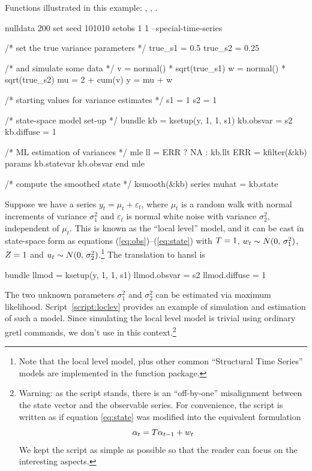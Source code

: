 Functions illustrated in this example: , ,
.

\begin{script}[htbp]
  \label{script:loclev}
\begin{scode}
nulldata 200
set seed 101010
setobs 1 1 --special-time-series

/* set the true variance parameters */
true_s1 = 0.5
true_s2 = 0.25

/* and simulate some data */
v = normal() * sqrt(true_s1)
w = normal() * sqrt(true_s2)
mu = 2 + cum(v)
y = mu + w

/* starting values for variance estimates */
s1 = 1
s2 = 1

/* state-space model set-up */
bundle kb = ksetup(y, 1, 1, s1)
kb.obsvar = s2
kb.diffuse = 1

/* ML estimation of variances */
mle ll = ERR ? NA : kb.llt
    ERR = kfilter(&kb)
    params kb.statevar kb.obsvar
end mle

/* compute the smoothed state */
ksmooth(&kb)
series muhat = kb.state
\end{scode}
\end{script}

Suppose we have a series $y_t = \mu_t + \varepsilon_t$, where $\mu_t$
is a random walk with normal increments of variance $\sigma^2_1$ and
$\varepsilon_t$ is normal white noise with variance $\sigma^2_2$,
independent of $\mu_t$. This is known as the ``local level'' model,
and it can be cast in state-space form as equations
(\ref{eq:obs})--(\ref{eq:state}) with $T = 1$, $w_t \sim
N(0,\, \sigma^2_1)$, $Z = 1$ and $u_t \sim N(0,\,
\sigma^2_2)$.\footnote{Note that the local level model, plus other
  common ``Structural Time Series'' models are implemented in the
   function package.} The translation to \textsf{hansl}
is
\begin{code}
bundle llmod = ksetup(y, 1, 1, s1)
llmod.obsvar = s2
llmod.diffuse = 1
\end{code}

The two unknown parameters $\sigma^2_1$ and $\sigma^2_2$ can be
estimated via maximum likelihood.  Script~\ref{script:loclev} provides
an example of simulation and estimation of such a model. Since
simulating the local level model is trivial using ordinary gretl
commands, we don't use  in this context.\footnote{Warning:
  as the script stands, there is an ``off-by-one'' misalignment
  between the state vector and the observable series. For convenience,
  the script is written as if equation \eqref{eq:state} was modified
  into the equivalent formulation
  \[
  \alpha_{t} = T \alpha_{t-1} + w_t
  \]
  We kept the script as simple as possible so that the reader can
  focus on the interesting aspects.}

